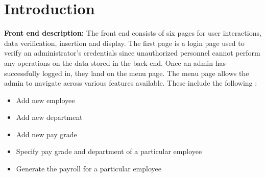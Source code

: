 \documentclass[12pt]{article}
\begin{document}
\section{Introduction}  %
\textbf{Front end description:}
\newline
\newline
The front end consists of six pages for user interactions, data verification, insertion and display. The first page is a login page used to verify an administrator's credentials since unauthorized personnel cannot perform any operations on the data stored in the back end. Once an admin has successfully logged in, they land on the menu page.
\newline
\newline
The menu page allows the admin to navigate across various features available. These include the following :
\begin{itemize}
    \item Add new employee
    \item Add new department
    \item Add new pay grade
    \item Specify pay grade and department of a particular employee
    \item Generate the payroll for a particular employee
\end{itemize}
\end{document}
